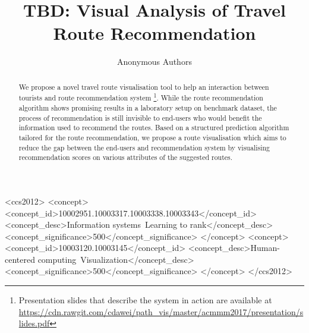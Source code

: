 \documentclass[sigconf]{acmart}
\begin{document}
\title{TBD: Visual Analysis of Travel Route Recommendation}

\author{Anonymous Authors}


%

\renewcommand{\shortauthors}{A. A}


\begin{abstract}
We propose a novel travel route visualisation tool to help an interaction between tourists and route recommendation system
\footnote{Presentation slides that describe the system in action are available at \url{https://cdn.rawgit.com/cdawei/path\_vis/master/acmmm2017/presentation/slides.pdf}}.
While the route recommendation algorithm shows promising results in a laboratory setup on benchmark dataset, the process of recommendation is still invisible to end-users who would benefit the information used to recommend the routes. 
Based on a structured prediction algorithm tailored for the route recommendation, we propose a route visualisation which aims to reduce the gap between the end-users and recommendation system by visualising recommendation scores on various attributes of the suggested routes.
\end{abstract}

%
%
\begin{CCSXML}
<ccs2012>
<concept>
<concept_id>10002951.10003317.10003338.10003343</concept_id>
<concept_desc>Information systems~Learning to rank</concept_desc>
<concept_significance>500</concept_significance>
</concept>
<concept>
<concept_id>10003120.10003145</concept_id>
<concept_desc>Human-centered computing~Visualization</concept_desc>
<concept_significance>500</concept_significance>
</concept>
</ccs2012>
\end{CCSXML}
\end{document}
